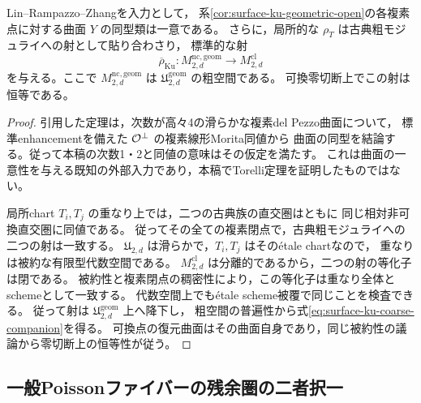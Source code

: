 \begin{corollary}[古典粗モジュライへの残余圏から定まる射]
\label{cor:surface-ku-coarse-companion}
Lin--Rampazzo--Zhang\cite[定理1.2]{LinRampazzoZhang2026}を入力として，
系\ref{cor:surface-ku-geometric-open}の各複素点に対する曲面 $Y$ の同型類は一意である。
さらに，局所的な $\rho_T$ は古典粗モジュライへの射として貼り合わさり，
標準的な射
\begin{equation}\label{eq:surface-ku-coarse-companion}
 \overline\rho_{\mathrm{Ku}}:
 M^{\mathrm{nc,geom}}_{2,d}\longrightarrow M^{\mathrm{cl}}_{2,d}
\end{equation}
を与える。ここで $M^{\mathrm{nc,geom}}_{2,d}$ は
$\mathfrak U^{\mathrm{geom}}_{2,d}$ の粗空間である。
可換零切断上でこの射は恒等である。
\end{corollary}
\begin{proof}
引用した定理は，次数が高々4の滑らかな複素del Pezzo曲面について，
標準enhancementを備えた $\mathcal O^\perp$ の複素線形Morita同値から
曲面の同型を結論する。従って本稿の次数1・2と同値の意味はその仮定を満たす。
これは曲面の一意性を与える既知の外部入力であり，本稿でTorelli定理を証明したものではない。

局所chart $T_i,T_j$ の重なり上では，二つの古典族の直交圏はともに
同じ相対非可換直交圏に同値である。
従ってその全ての複素閉点で，古典粗モジュライへの二つの射は一致する。
$\mathfrak U_{2,d}$ は滑らかで，$T_i,T_j$ はその\'{e}tale chartなので，
重なりは被約な有限型代数空間である。
$M^{\mathrm{cl}}_{2,d}$ は分離的であるから，二つの射の等化子は閉である。
被約性と複素閉点の稠密性により，この等化子は重なり全体とschemeとして一致する。
代数空間上でも\'{e}tale scheme被覆で同じことを検査できる。
従って射は $\mathfrak U^{\mathrm{geom}}_{2,d}$ 上へ降下し，
粗空間の普遍性から式\eqref{eq:surface-ku-coarse-companion}を得る。
可換点の復元曲面はその曲面自身であり，同じ被約性の議論から零切断上の恒等性が従う。
\end{proof}

\subsection{一般Poissonファイバーの残余圏の二者択一}

